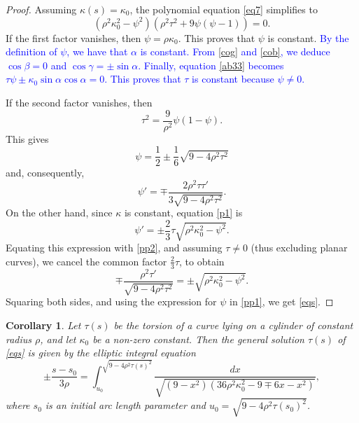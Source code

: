 \documentclass[a4paper,12pt]{amsart}
\theoremstyle{plain}
\newtheorem{corollary}[theorem]{Corollary}
\theoremstyle{definition}
\begin{document}
\begin{proof}
 Assuming $\kappa(s) = \kappa_0$, the polynomial equation \eqref{eq7} simplifies   to
\[
(\rho^2 \kappa_0^2 - \psi^2) (\rho^2 \tau^2 + 9 \psi (\psi - 1)) = 0.
\]
If the first factor vanishes, then $\psi = \rho \kappa_0$. This proves that $\psi$ is constant. \textcolor{blue}{By the definition of $\psi$, we have that $\alpha$ is constant. From \eqref{cog} and \eqref{cob}, we deduce $\cos\beta=0$ and $\cos\gamma=\pm\sin\alpha$. Finally, equation \eqref{ab33} becomes $\tau\psi\pm \kappa_0\sin\alpha\cos\alpha=0$. This proves that $\tau$ is constant because $\psi\not=0$.}



If the second factor vanishes, then 
$$\tau^2 = \frac{9}{\rho^2}\psi(1-\psi).$$
This gives 
\begin{equation}\label{pp1}
 \psi = \frac{1}{2} \pm \frac{1}{6}\sqrt{9 - 4\rho^2\tau^2} 
 \end{equation}
and, consequently, 
\begin{equation}\label{pp2}
 \psi' = \mp \frac{2\rho^2\tau\tau'}{3\sqrt{9 - 4\rho^2\tau^2}}. 
 \end{equation}
On the other hand, since $\kappa$ is constant, equation \eqref{p1} is 
$$ \psi' = \pm \frac{2}{3}\tau \sqrt{\rho^2\kappa_0^2 - \psi^2}. $$
Equating this expression with \eqref{pp2},  and assuming $\tau \neq 0$ (thus excluding planar curves), we cancel the common factor $\frac{2}{3}\tau$, to obtain
$$ \mp \frac{\rho^2\tau'}{\sqrt{9 - 4\rho^2\tau^2}} = \pm \sqrt{\rho^2\kappa_0^2 - \psi^2}. $$
Squaring both sides, and using the expression for $\psi$ in \eqref{pp1}, we get \eqref{eqs}. 
\end{proof}
 
 \begin{corollary}
Let $\tau(s)$ be the torsion of a curve lying on a cylinder of constant radius $\rho$, and let $\kappa_0$ be a non-zero constant. Then    the general solution $\tau(s)$  of \eqref{eqs}   is   given by the elliptic integral equation
\begin{equation}\label{eq26}
    \pm \frac{s - s_0}{3\rho} = \int_{u_0}^{\sqrt{9 - 4\rho^2\tau(s)^2}} \frac{dx}{\sqrt{(9 - x^2)\left(36\rho^2\kappa_0^2 - 9 \mp 6x - x^2\right)}},
\end{equation}
where $s_0$ is an initial arc length parameter and $u_0 = \sqrt{9 - 4\rho^2\tau(s_0)^2}$.
\end{corollary}
\end{document}
